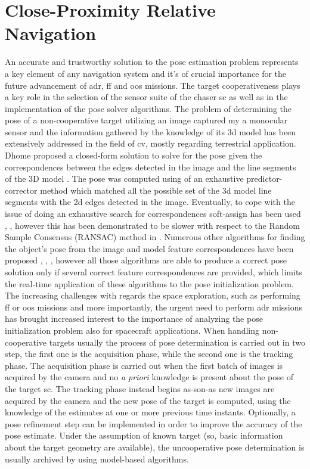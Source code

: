 \section{Close-Proximity Relative Navigation}
An accurate and trustworthy solution to the pose estimation problem represents a key element of any navigation system and it's of crucial importance for the future advancement of \acrshort{adr}, \acrshort{ff} and \acrshort{oos} missions. The target cooperativeness plays a key role in the selection of the sensor suite of the chaser \acrshort{sc} as well as in the implementation of the pose solver algorithms.
The problem of determining the pose of a non-cooperative target utilizing an image captured my a monocular sensor and the information gathered by the knowledge of its \acrshort{3d} model has been extensively addressed in the field of \acrshort{cv}, mostly regarding terrestrial application. Dhome proposed a closed-form solution to solve for the pose given the correspondences between the edges detected in the image and the line segments of the 3D model \cite{Dhome1989}. The pose was computed using of an exhaustive predictor-corrector method which matched all the possible set of the \acrshort{3d} model line segments with the \acrshort{2d} edges detected in the image. Eventually, to cope with the issue of doing an exhaustive search for correspondences soft-assign has been used \cite{Gold1994}, \cite{David2004}, however this has been demonstrated to be slower with respect to the Random Sample Consensus (RANSAC) method in \cite{Attia2016}. Numerous other algorithms for finding the object's pose from the image and model feature correspondences have been proposed \cite{Mirzaei2011}, \cite{Xu2017}, \cite{10.1007/s11263-008-0152-6}, however all those algorithms are able to produce a correct pose solution only if several correct feature correspondences are provided, which limits the real-time application of these algorithms to the pose initialization problem.
The increasing challenges with regards the space exploration, such as performing \acrshort{ff} or \acrshort{oos} missions and more importantly, the urgent need to perform \acrshort{adr} missions has brought increased interest to the importance of analyzing the pose initialization problem also for spacecraft applications. When handling non-cooperative targets usually the process of pose determination is carried out in two step, the first one is the acquisition phase, while the second one is the tracking phase. The acquisition phase is carried out when the first batch of images is acquired by the camera and no \textit{a priori} knowledge is present about the pose of the target \acrshort{sc}. The tracking phase instead begins as-son-as new images are acquired by the camera and the new pose of the target is computed, using the knowledge of the estimates at one or more previous time instants. Optionally, a pose refinement step can be implemented in order to improve the accuracy of the pose estimate. Under the assumption of known target (so, basic information about the target geometry are available), the uncooperative pose determination is usually archived by using model-based algorithms.
